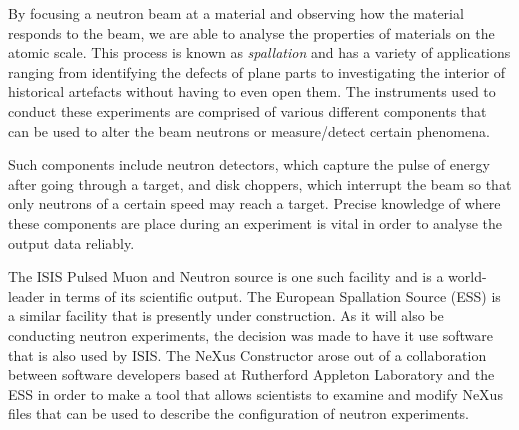 By focusing a neutron beam at a material and observing how the material responds to the beam, we are able to analyse the properties of materials on the atomic scale. This process is known as \textit{spallation} and has a variety of applications ranging from identifying the defects of plane parts to investigating the interior of historical artefacts without having to even open them. The instruments used to conduct these experiments are comprised of various different components that can be used to alter the beam neutrons or measure/detect certain phenomena. 

Such components include neutron detectors, which capture the pulse of energy after going through a target, and disk choppers, which interrupt the beam so that only neutrons of a certain speed may reach a target. Precise knowledge of where these components are place during an experiment is vital in order to analyse the output data reliably. 

The ISIS Pulsed Muon and Neutron source is one such facility and is a world-leader in terms of its scientific output. The European Spallation Source (ESS) is a similar facility that is presently under construction. As it will also be conducting neutron experiments, the decision was made to have it use software that is also used by ISIS. The NeXus Constructor arose out of a collaboration between software developers based at Rutherford Appleton Laboratory and the ESS in order to make a tool that allows scientists to examine and modify NeXus files that can be used to describe the configuration of neutron experiments.
